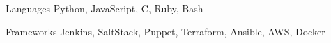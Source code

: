 
\begin{cvskills}
  \cvskill
    {Languages} %
    {Python, JavaScript, C, Ruby, Bash} %

  \cvskill
    {Frameworks} %
    {Jenkins, SaltStack, Puppet, Terraform, Ansible, AWS, Docker} %
\end{cvskills}
